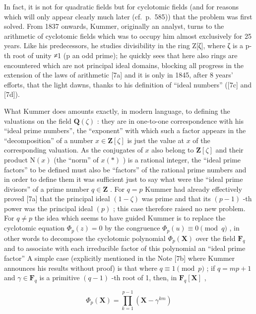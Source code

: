 In fact, it is not for quadratic fields but for cyclotomic fields (and for reasons which will only appear clearly much later (cf.~p.~585)) that the problem was first solved. From 1837 onwards, Kummer, originally an analyst, turns to the arithmetic of cyclotomic fields which was to occupy him almost exclusively for 25 years. Like his predecessors, he studies divisibility in the ring Z{[}ζ{]}, where ζ is a p-th root of unity ≠1 (p an odd prime); he quickly sees that here also rings are encountered which are not principal ideal domains, blocking all progress in the extension of the laws of arithmetic {[}7a{]} and it is only in 1845, after 8 years' efforts, that the light dawns, thanks to his definition of ``ideal numbers'' ({[}7c{]} and {[}7d{]}).

What Kummer does amounts exactly, in modern language, to defining the valuations on the field \(\mathbf{Q}(\zeta)\) : they are in one-to-one correspondence with his ``ideal prime numbers'', the ``exponent'' with which such a factor appears in the ``decomposition'' of a number \(x \in \mathbf{Z}[\zeta]\) is just the value at \(x\) of the corresponding valuation. As the conjugates of \(x\) also belong to \(\mathbf{Z}[\zeta]\) and their product \(\mathrm{N}(x)\) (the ``norm'' of \(x(*)\) ) is a rational integer, the ``ideal prime factors'' to be defined must also be ``factors'' of the rational prime numbers and in order to define them it was sufficient just to say what were the ``ideal prime divisors'' of a prime number \(q \in \mathbf{Z}\) . For \(q = p\) Kummer had already effectively proved {[}7a{]} that the principal ideal \((1 - \zeta)\) was prime and that its \((p - 1)\) -th power was the principal ideal \((p)\) ; this case therefore raised no new problem. For \(q \neq p\) the idea which seems to have guided Kummer is to replace the cyclotomic equation \(\Phi_p(z) = 0\) by the congruence \(\Phi_p(u) \equiv 0 \pmod{q}\) , in other words to decompose the cyclotomic polynomial \(\Phi_p(\mathbf{X})\) over the field \(\mathbf{F}_q\) and to associate with each irreducible factor of this polynomial an ``ideal prime factor'' A simple case (explicitly mentioned in the Note {[}7b{]} where Kummer announces his results without proof) is that where \(q \equiv 1 \pmod{p}\) ; if \(q = mp + 1\) and \(\gamma \in \mathbf{F}_q\) is a primitive \((q - 1)\) -th root of 1, then, in \(\mathbf{F}_q[\mathbf{X}]\) ,

\[
\Phi_ {p} (\mathbf {X}) = \prod_ {k = 1} ^ {p - 1} \left(\mathbf {X} - \gamma^ {k m}\right)
\]

